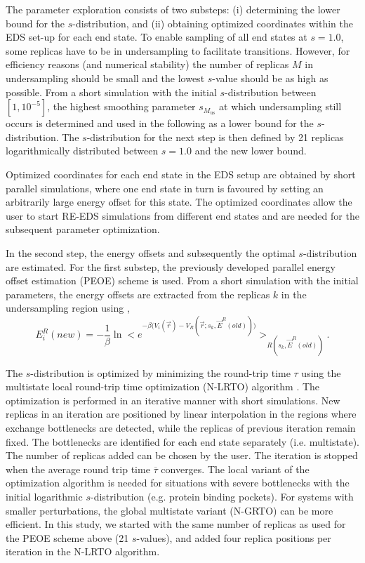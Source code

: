 The parameter exploration consists of two substeps: (i) determining the lower bound for the $s$-distribution, and (ii) obtaining optimized coordinates within the EDS set-up for each end state.
To enable sampling of all end states at $s=1.0$, some replicas have to be in undersampling to facilitate transitions. However, for efficiency reasons (and numerical stability) the number of replicas $M$ in undersampling should be small and the lowest $s$-value should be as high as possible. From a short simulation with the initial $s$-distribution between $[1, 10^{-5}]$, the highest smoothing parameter $s_{M_\mathrm{us}}$ at which undersampling still occurs is determined and used in the following as a lower bound for the $s$-distribution. The $s$-distribution for the next step is then defined by 21 replicas logarithmically distributed between $s=1.0$ and the new lower bound.

Optimized coordinates for each end state in the EDS setup are obtained by short parallel simulations, where one end state in turn is favoured by setting an arbitrarily large energy offset for this state. 
The optimized coordinates allow the user to start RE-EDS simulations from different end states and are needed for the subsequent parameter optimization. 

In the second step, the energy offsets and subsequently the optimal $s$-distribution are estimated. For the first substep, the previously developed parallel energy offset estimation (PEOE) \cite{Sidler2016} scheme is used. From a short simulation with the initial parameters, the energy offsets are extracted from the replicas $k$ in the undersampling region using \cite{Sidler2016},
\begin{equation}
E_{i}^{R}(new)=-\frac{1}{\beta}\ln \Big < e^{-\beta \big(V_i(\vec{r})-V_R(\vec{r}; s_{k},\vec{E}^{R}(old))\big)}\Big>_{R(s_{k},\vec{E}^{R}(old))} .
\label{eq: EoffEstimator}
\end{equation}

The $s$-distribution is optimized by minimizing the round-trip time $\tau$ using the multistate local round-trip time optimization (N-LRTO) algorithm \cite{Sidler2017}. The optimization is performed in an iterative manner with short simulations.  
New replicas in an iteration are positioned by linear interpolation in the regions where exchange bottlenecks are detected, while the replicas of previous iteration remain fixed. The bottlenecks are identified for each end state separately (i.e. multistate). The number of replicas added can be chosen by the user. The iteration is stopped when the average round trip time $\overline{\tau}$ converges. 
The local variant of the optimization algorithm is needed for situations with severe bottlenecks with the initial logarithmic $s$-distribution (e.g. protein binding pockets). For systems with smaller perturbations, 
the global multistate variant (N-GRTO) \cite{Sidler2017} can be more efficient.
%
In this study, we started with the same number of replicas as used for the PEOE scheme above (21 $s$-values), and added four replica positions per iteration in the N-LRTO algorithm.

